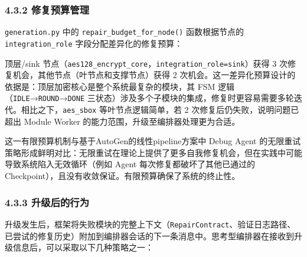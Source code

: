 \subsubsection{4.3.2
修复预算管理}\label{ux4feeux590dux9884ux7b97ux7ba1ux7406}

\texttt{generation.py} 中的 \texttt{repair\_budget\_for\_node()}
函数根据节点的 \texttt{integration\_role} 字段分配差异化的修复预算：

\begin{Shaded}
\begin{Highlighting}[]
\OperatorTok{{-}\textgreater{}} \NormalTok{:}
    \NormalTok{ (}\NormalTok{, }\NormalTok{):}
\end{Highlighting}
\end{Shaded}

顶层/sink
节点（\texttt{aes128\_encrypt\_core}，\texttt{integration\_role=\textquotesingle{}sink\textquotesingle{}}）获得
3 次修复机会，其他节点（叶节点和支撑节点）获得 2
次机会。这一差异化预算设计的依据是：顶层加密核心是整个系统最复杂的模块，其
FSM 逻辑（\texttt{IDLE}→\texttt{ROUND}→\texttt{DONE}
三状态）涉及多个子模块的集成，修复时更容易需要多轮迭代。相比之下，\texttt{aes\_sbox}
等叶节点逻辑简单，若 2 次修复后仍失败，说明问题已超出 Module Worker
的能力范围，升级至编排器处理更为合适。

这一有限预算机制与基于AutoGen的线性pipeline方案中 Debug Agent
的无限重试策略形成鲜明对比：无限重试在理论上提供了更多自我修复机会，但在实践中可能导致系统陷入无效循环（例如
Agent 每次修复都破坏了其他已通过的
Checkpoint），且没有收敛保证。有限预算确保了系统的终止性。

\subsubsection{4.3.3
升级后的行为}\label{ux5347ux7ea7ux540eux7684ux884cux4e3a}

升级发生后，框架将失败模块的完整上下文（\texttt{RepairContract}、验证日志路径、已尝试的修复历史）附加到编排器会话的下一条消息中。思考型编排器在接收到升级信息后，可以采取以下几种策略之一：

